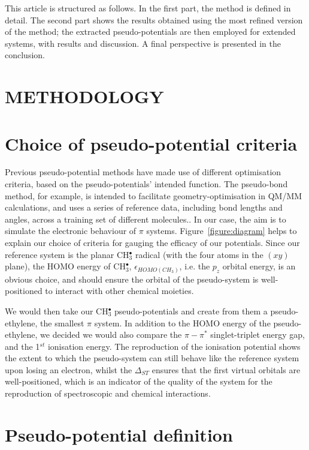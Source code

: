 \documentclass[12pt]{article}
\begin{document}
This article is structured as follows.
In the first part, the method is defined in detail.
The second part shows the results obtained using the most refined version of the method; the extracted pseudo-potentials are then employed for extended systems, with results and discussion. A final perspective is presented in the conclusion.

\section*{\sffamily \Large METHODOLOGY}

\section*{\sffamily \large Choice of pseudo-potential criteria \label{section:pseudocrit}} 

Previous pseudo-potential methods have made use of different optimisation criteria, based on the pseudo-potentials' intended function. 
The pseudo-bond method, for example, is intended to facilitate geometry-optimisation in QM/MM calculations, and uses a series of reference data, 
including bond lengths and angles, across a training set of different molecules.\cite{zhang_pseudobond_1998}.
In our case, the aim is to simulate the electronic behaviour of $\pi$ systems.
Figure~\ref{figure:diagram} helps to explain our choice of criteria for gauging the efficacy of our potentials. Since our reference system is the planar CH$_3^\bullet$ radical (with the four atoms in the $(xy)$ plane), the HOMO energy of CH$_3^{\bullet}$, $\epsilon_{HOMO(CH_3)}$, i.e. the $p_{z}$ orbital energy, is an obvious choice, and should ensure the orbital of the pseudo-system is well-positioned to interact with other chemical moieties.

We would then take our CH$_3^{\bullet}$ pseudo-potentials and create from them a pseudo-ethylene, the smallest $\pi$ system.
In addition to the HOMO energy of the pseudo-ethylene, we decided we would also compare the $\pi-\pi^{*}$ singlet-triplet energy gap, 
and the 1$^{st}$ ionisation energy. The reproduction of the ionisation potential shows the extent to which the pseudo-system 
can still behave like the reference system upon losing an electron, whilst the $\Delta_{ST}$ ensures that the first virtual 
orbitals are well-positioned, which is an indicator of the quality of the system for the reproduction of spectroscopic and 
chemical interactions.

\section*{\sffamily \large Pseudo-potential definition} \label{secpotdef}
\end{document}
